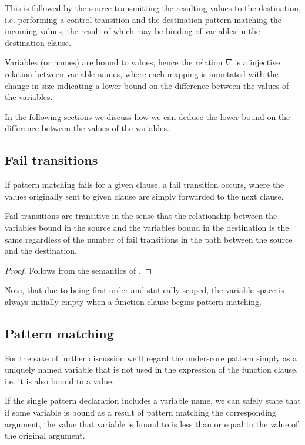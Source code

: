 This is followed by the source transmitting the resulting values to the
destination, i.e.  performing a control transition and the destination pattern
matching the incoming values, the result of which may be binding of variables
in the destination clause.

Variables (or names) are bound to values, hence the relation $\nabla$ is a
injective relation between variable names, where each mapping is annotated with
the change in size indicating a lower bound on the difference between the
values of the variables.

In the following sections we discuss how we can deduce the lower bound on the
difference between the values of the variables.

\subsection{Fail transitions}

If pattern matching fails for a given clause, a fail transition occurs, where
the values originally sent to given clause are simply forwarded to the next
clause.

\begin{lemma} Fail transitions are transitive in the sense that the
relationship between the variables bound in the source and the variables bound
in the destination is the same regardless of the number of fail transitions in
the path between the source and the destination.\end{lemma}

\begin{proof} Follows from the semantics of \D{}. \end{proof}

Note, that due to \D{} being first order and statically scoped, the variable
space is always initially empty when a function clause begins pattern matching.

\subsection{Pattern matching}

\begin{definition} For the sake of further discussion we'll regard the
underscore pattern simply as a uniquely named variable that is not used in the
expression of the function clause, i.e. it is also bound to a
value.\end{definition}

\begin{lemma}\label{lemma:d-pattern-leq} If the single pattern declaration
includes a variable name, we can safely state that if some variable is bound as
a result of pattern matching the corresponding argument, the value that
variable is bound to is less than or equal to the value of the original
argument. \end{lemma}

